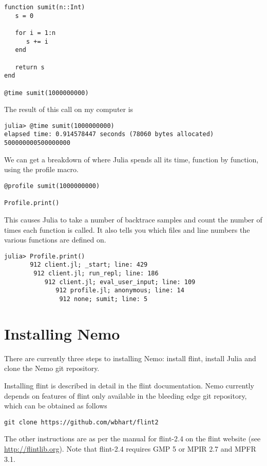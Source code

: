 \documentclass[a4paper,10pt]{article}
\begin{document}
{\begin{lstlisting}
function sumit(n::Int)
   s = 0

   for i = 1:n
      s += i
   end

   return s
end

@time sumit(1000000000)
\end{lstlisting}

The result of this call on my computer is

\begin{verbatim}
julia> @time sumit(1000000000)
elapsed time: 0.914578447 seconds (78060 bytes allocated)
500000000500000000
\end{verbatim}

We can get a breakdown of where Julia spends all its time, function by function,
using the profile macro.

\begin{lstlisting}
@profile sumit(1000000000)

Profile.print()
\end{lstlisting}

This causes Julia to take a number of backtrace samples and count the number of times
each function is called. It also tells you which files and line numbers the various
functions are defined on.

\begin{verbatim}
julia> Profile.print()
       912 client.jl; _start; line: 429
        912 client.jl; run_repl; line: 186
           912 client.jl; eval_user_input; line: 109
              912 profile.jl; anonymous; line: 14
               912 none; sumit; line: 5
\end{verbatim}

\section{Installing Nemo}

There are currently three steps to installing Nemo: install flint, install Julia and
clone the Nemo git repository.

Installing flint is described in detail in the flint documentation. Nemo currently
depends on features of flint only available in the bleeding edge git repository,
which can be obtained as follows

\begin{verbatim}
git clone https://github.com/wbhart/flint2
\end{verbatim}

The other instructions are as per the manual for flint-2.4 on the flint website (see
\url{http://flintlib.org}). Note that flint-2.4 requires GMP 5 or MPIR 2.7 and MPFR
3.1.

}
\end{document}
